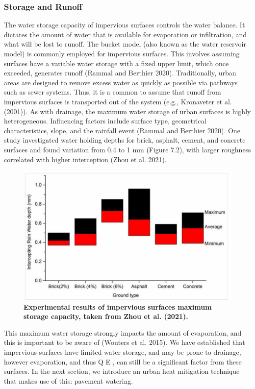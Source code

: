 \documentclass[final,3p,times,authoryear]{elsarticle}
\begin{document}
\subsubsection{Storage and Runoff}\label{sec:appendix7.1.3.3}

The water storage capacity of impervious surfaces controls the water balance. It dictates
the amount of water that is available for evaporation or infiltration, and what will be lost
to runoff.
The bucket model (also known as the water reservoir model) is commonly employed for
impervious surfaces. This involves assuming surfaces have a variable water storage with
a fixed upper limit, which once exceeded, generates runoff (Rammal and Berthier
2020). Traditionally, urban areas are designed to remove excess water as quickly as
possible via pathways such as sewer systems. Thus, it is a common to assume that runoff from impervious surfaces is transported out of the system (e.g., Kronaveter et al.
(2001)).
As with drainage, the maximum water storage of urban surfaces is highly
heterogeneous. Influencing factors include surface type, geometrical characteristics,
slope, and the rainfall event (Rammal and Berthier 2020). One study investigated water
holding depths for brick, asphalt, cement, and concrete surfaces and found variation
from 0.4 to 1 mm (Figure 7.2), with larger roughness correlated with higher interception
(Zhou et al. 2021).

\begin{figure}
\centering
\includegraphics[trim={0 0 0 0},clip,scale=1.0]{Impervious.png}
\caption{\bf Experimental results of impervious surfaces maximum storage capacity, taken from Zhou et
al. (2021).}
 \label{fig:7.2}
\end{figure}

This maximum water storage strongly impacts the amount of evaporation, and this is
important to be aware of (Wouters et al. 2015).
We have established that impervious surfaces have limited water storage, and may be
prone to drainage, however evaporation, and thus Q E , can still be a significant factor from these surfaces. In the next section, we introduce an urban heat mitigation
technique that makes use of this: pavement watering.
\end{document}
